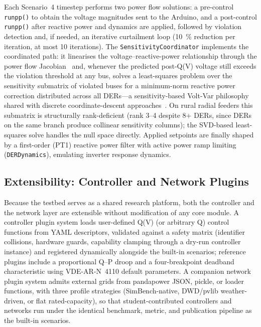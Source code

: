 \documentclass[conference]{IEEEtran}
\begin{document}
Each Scenario~4 timestep performs two power flow solutions: a
pre-control \texttt{runpp()} to obtain the voltage magnitudes sent to the
Arduino, and a post-control \texttt{runpp()} after reactive power and
dynamics are applied, followed by violation detection and, if needed, an
iterative curtailment loop (\SI{10}{\percent} reduction per iteration, at
most 10 iterations). The \texttt{SensitivityCoordinator} implements the
coordinated path: it linearises the voltage--reactive-power relationship
through the power flow Jacobian~\cite{christakou2013} and, whenever the
predicted post-Q(V) voltage still exceeds the violation threshold at any
bus, solves a least-squares problem over the sensitivity submatrix of
violated buses for a minimum-norm reactive power correction distributed
across all DERs---a sensitivity-based Volt-Var philosophy shared with
discrete coordinate-descent approaches~\cite{jabr2016}. On rural radial
feeders this submatrix is structurally rank-deficient (rank 3--4 despite
8+ DERs, since DERs on the same branch produce collinear sensitivity
columns); the SVD-based least-squares solve handles the null space
directly. Applied setpoints are finally shaped by a first-order (PT1)
reactive power filter with active power ramp limiting
(\texttt{DERDynamics}), emulating inverter response dynamics.

\subsection{Extensibility: Controller and Network Plugins}
\label{sec:plugins}

Because the testbed serves as a shared research platform, both the
controller and the network layer are extensible without modification of
any core module. A controller plugin system loads user-defined Q(V) (or
arbitrary Q) control functions from YAML descriptors, validated against a
safety matrix (identifier collisions, hardware guards, capability
clamping through a dry-run controller instance) and registered
dynamically alongside the built-in scenarios; reference plugins include a
proportional Q--P droop and a four-breakpoint deadband characteristic
using VDE-AR-N~4110 default parameters. A companion network plugin system
admits external grids from pandapower JSON, pickle, or loader functions,
with three profile strategies (SimBench-native, DWD/pvlib weather-driven,
or flat rated-capacity), so that student-contributed controllers and
networks run under the identical benchmark, metric, and publication
pipeline as the built-in scenarios.
\end{document}
